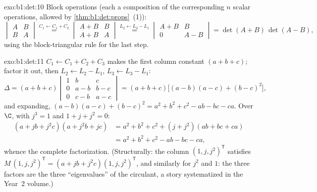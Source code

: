 \begin{solution}{exo:b1:det:10}
Block operations (each a composition of the corresponding $n$ scalar
operations, allowed by \cref{thm:b1:det:props}~(1)):
\[
\begin{vmatrix} A & B\\ B & A\end{vmatrix}
\overset{C_1 \leftarrow C_1 + C_2}{=}
\begin{vmatrix} A + B & B\\ A + B & A\end{vmatrix}
\overset{L_2 \leftarrow L_2 - L_1}{=}
\begin{vmatrix} A + B & B\\ 0 & A - B\end{vmatrix}
= \det(A+B)\,\det(A-B),
\]
using the block-triangular rule for the last step.
\end{solution}

\begin{solution}{exo:b1:det:11}
$C_1 \leftarrow C_1 + C_2 + C_3$ makes the first column constant
$(a + b + c)$; factor it out, then $L_2 \leftarrow L_2 - L_1$,
$L_3 \leftarrow L_3 - L_1$:
\[
\Delta = (a+b+c)\begin{vmatrix}
1 & b & c\\
0 & a - b & b - c\\
0 & c - b & a - c
\end{vmatrix}
= (a+b+c)\bigl[(a-b)(a-c) + (b-c)^2\bigr],
\]
and expanding, $(a-b)(a-c) + (b-c)^2 = a^2 + b^2 + c^2 - ab - bc
- ca$. Over $\C$, with $j^3 = 1$ and $1 + j + j^2 = 0$:
\begin{align*}
(a + jb + j^2c)(a + j^2b + jc)
&= a^2 + b^2 + c^2 + (j + j^2)(ab + bc + ca)\\
&= a^2 + b^2 + c^2 - ab - bc - ca ,
\end{align*}
whence the complete factorization. (Structurally: the column
$(1, j, j^2)^{\mathsf T}$ satisfies $M\,(1, j, j^2)^{\mathsf T}
= (a + jb + j^2c)(1, j, j^2)^{\mathsf T}$, and similarly for
$j^2$ and $1$: the three factors are the three ``eigenvalues''
of the circulant, a story systematized in the Year~2 volume.)
\end{solution}

